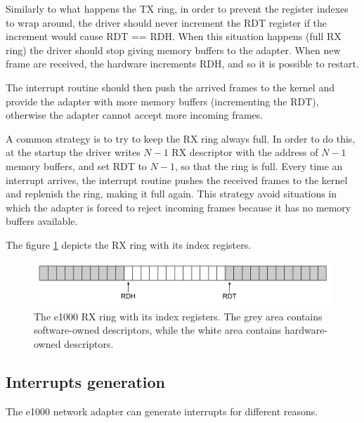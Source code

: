 Similarly to what happens the TX ring, in order to prevent the register indexes to wrap around, the driver should never increment the RDT
register if the increment would cause RDT == RDH. When this situation happens (full RX ring) the driver should stop giving memory buffers to
the adapter. When new frame are received, the hardware increments RDH, and so it is possible to restart.

The interrupt routine should then push the arrived frames to the kernel and provide the adapter with more memory buffers (incrementing
the RDT), otherwise the adapter cannot accept more incoming frames.

A common strategy is to try to keep the RX ring always full. In order to do this, at the startup
the driver writes $N-1$ RX descriptor with the address of $N-1$ memory buffers, and set RDT to $N-1$, so that the ring is full.
Every time an interrupt arrives, the interrupt routine pushes the received frames to the kernel and replenish the ring, making it full again.
This strategy avoid situations in which the adapter is forced to reject incoming frames because it has no memory buffers available.

The figure \ref{fig:rxring} depicts the RX ring with its index registers.

\begin{figure}[bt]
\centering
\includegraphics[scale = 0.35]{rx-ring.pdf}
\caption{The e1000 RX ring with its index registers. The grey area contains software-owned descriptors, while the white area
	contains hardware-owned descriptors.}
\label{fig:rxring}
\end{figure}


\subsection{Interrupts generation}
\label{sec:e1000int}
The e1000 network adapter can generate interrupts for different reasons.

